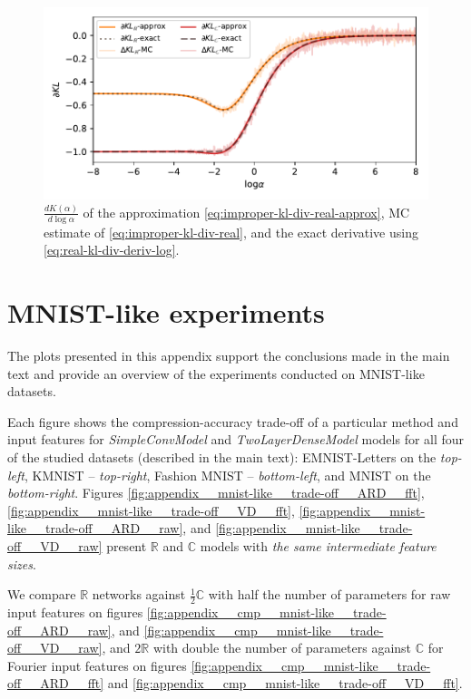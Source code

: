 \documentclass[a4paper,10pt,twocolumn]{article}
\newcommand{\real}{\mathbb{R}}
\newcommand{\cplx}{\mathbb{C}}
\begin{document}
\begin{figure}[!t]
  \centering
  \includegraphics[width=\columnwidth]{grad_log.pdf}
  \caption{$\tfrac{d K(\alpha)}{d \log{\alpha}}$ of the approximation
  \eqref{eq:improper-kl-div-real-approx}, MC estimate of \eqref{eq:improper-kl-div-real},
  and the exact derivative using \eqref{eq:real-kl-div-deriv-log}.}
  \label{fig:molchanov-derivative-replica}
\end{figure}


\section{MNIST-like experiments} %
\label{sec:mnist_like_experiments}

The plots presented in this appendix support the conclusions made in the main text and
provide an overview of the experiments conducted on MNIST-like datasets.

Each figure shows the compression-accuracy trade-off of a particular method and input
features for \emph{SimpleConvModel} and \emph{TwoLayerDenseModel} models for all four
of the studied datasets (described in the main text): EMNIST-Letters on the \emph{top-left},
KMNIST -- \emph{top-right}, Fashion MNIST -- \emph{bottom-left}, and MNIST on the
\emph{bottom-right}.
%
Figures \ref{fig:appendix__mnist-like__trade-off__ARD__fft}, \ref{fig:appendix__mnist-like__trade-off__VD__fft},
\ref{fig:appendix__mnist-like__trade-off__ARD__raw}, and \ref{fig:appendix__mnist-like__trade-off__VD__raw}
present $\real$ and $\cplx$ models with \emph{the same intermediate feature sizes}.

We compare $\real$ networks against $\tfrac12 \cplx$ with half the number of parameters
for raw input features on figures \ref{fig:appendix__cmp__mnist-like__trade-off__ARD__raw},
and \ref{fig:appendix__cmp__mnist-like__trade-off__VD__raw}, and $2 \real$ with
double the number of parameters against $\cplx$ for Fourier input features on figures
\ref{fig:appendix__cmp__mnist-like__trade-off__ARD__fft} and
\ref{fig:appendix__cmp__mnist-like__trade-off__VD__fft}.
\end{document}
